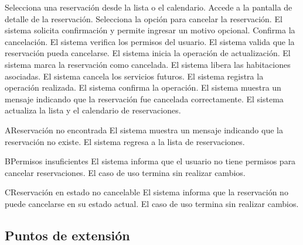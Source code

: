 \begin{UCtrayectoria}
	\UCpaso[\UCactor] Selecciona una reservación desde la lista o el calendario.
	\UCpaso[\UCactor] Accede a la pantalla de detalle de la reservación.
	\UCpaso[\UCactor] Selecciona la opción para cancelar la reservación.
	\UCpaso El sistema solicita confirmación y permite ingresar un motivo opcional.
	\UCpaso[\UCactor] Confirma la cancelación.
	\UCpaso El sistema verifica los permisos del usuario.
	\UCpaso El sistema valida que la reservación pueda cancelarse.
	\UCpaso El sistema inicia la operación de actualización.
	\UCpaso El sistema marca la reservación como cancelada.
	\UCpaso El sistema libera las habitaciones asociadas.
	\UCpaso El sistema cancela los servicios futuros.
	\UCpaso El sistema registra la operación realizada.
	\UCpaso El sistema confirma la operación.
	\UCpaso El sistema muestra un mensaje indicando que la reservación fue cancelada correctamente.
	\UCpaso El sistema actualiza la lista y el calendario de reservaciones.
\end{UCtrayectoria}

\begin{UCtrayectoriaA}{A}{Reservación no encontrada}
	\UCpaso El sistema muestra un mensaje indicando que la reservación no existe.
	\UCpaso El sistema regresa a la lista de reservaciones.
\end{UCtrayectoriaA}

\begin{UCtrayectoriaA}{B}{Permisos insuficientes}
	\UCpaso El sistema informa que el usuario no tiene permisos para cancelar reservaciones.
	\UCpaso El caso de uso termina sin realizar cambios.
\end{UCtrayectoriaA}

\begin{UCtrayectoriaA}{C}{Reservación en estado no cancelable}
	\UCpaso El sistema informa que la reservación no puede cancelarse en su estado actual.
	\UCpaso El caso de uso termina sin realizar cambios.
\end{UCtrayectoriaA}

\subsection{Puntos de extensión}

